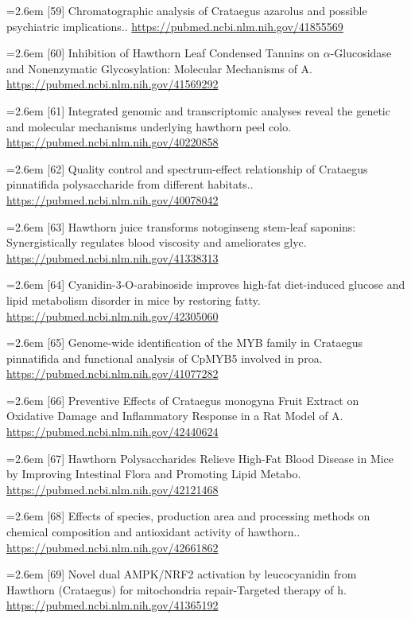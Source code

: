 \documentclass[11pt]{article}
\begin{document}
{\noindent\hangindent=2.6em [59] Chromatographic analysis of Crataegus azarolus and possible psychiatric implications.. \url{https://pubmed.ncbi.nlm.nih.gov/41855569}\par
\noindent\hangindent=2.6em [60] Inhibition of Hawthorn Leaf Condensed Tannins on $\alpha$-Glucosidase and Nonenzymatic Glycosylation: Molecular Mechanisms of A. \url{https://pubmed.ncbi.nlm.nih.gov/41569292}\par
\noindent\hangindent=2.6em [61] Integrated genomic and transcriptomic analyses reveal the genetic and molecular mechanisms underlying hawthorn peel colo. \url{https://pubmed.ncbi.nlm.nih.gov/40220858}\par
\noindent\hangindent=2.6em [62] Quality control and spectrum-effect relationship of Crataegus pinnatifida polysaccharide from different habitats.. \url{https://pubmed.ncbi.nlm.nih.gov/40078042}\par
\noindent\hangindent=2.6em [63] Hawthorn juice transforms notoginseng stem-leaf saponins: Synergistically regulates blood viscosity and ameliorates glyc. \url{https://pubmed.ncbi.nlm.nih.gov/41338313}\par
\noindent\hangindent=2.6em [64] Cyanidin-3-O-arabinoside improves high-fat diet-induced glucose and lipid metabolism disorder in mice by restoring fatty. \url{https://pubmed.ncbi.nlm.nih.gov/42305060}\par
\noindent\hangindent=2.6em [65] Genome-wide identification of the MYB family in Crataegus pinnatifida and functional analysis of CpMYB5 involved in proa. \url{https://pubmed.ncbi.nlm.nih.gov/41077282}\par
\noindent\hangindent=2.6em [66] Preventive Effects of Crataegus monogyna Fruit Extract on Oxidative Damage and Inflammatory Response in a Rat Model of A. \url{https://pubmed.ncbi.nlm.nih.gov/42440624}\par
\noindent\hangindent=2.6em [67] Hawthorn Polysaccharides Relieve High-Fat Blood Disease in Mice by Improving Intestinal Flora and Promoting Lipid Metabo. \url{https://pubmed.ncbi.nlm.nih.gov/42121468}\par
\noindent\hangindent=2.6em [68] Effects of species, production area and processing methods on chemical composition and antioxidant activity of hawthorn.. \url{https://pubmed.ncbi.nlm.nih.gov/42661862}\par
\noindent\hangindent=2.6em [69] Novel dual AMPK/NRF2 activation by leucocyanidin from Hawthorn (Crataegus) for mitochondria repair-Targeted therapy of h. \url{https://pubmed.ncbi.nlm.nih.gov/41365192}\par
}
\end{document}
